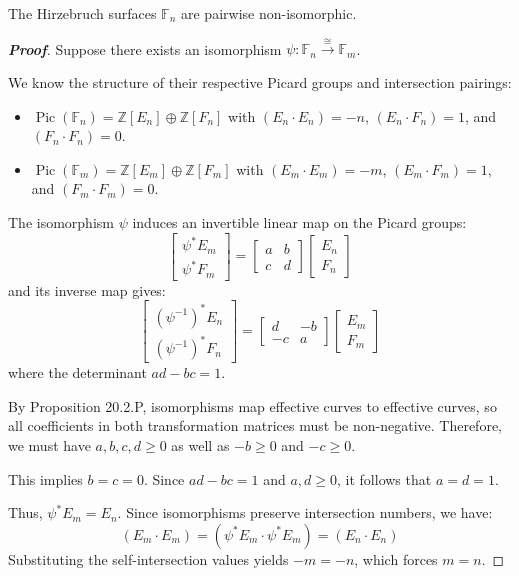 \begin{corollary}[20.2.Q]
The Hirzebruch surfaces $\mathbb{F}_n$ are pairwise non-isomorphic.
\end{corollary}

\begin{proof}[\textbf{Proof}]
Suppose there exists an isomorphism $\psi: \mathbb{F}_n \xrightarrow{\cong} \mathbb{F}_m$. 

We know the structure of their respective Picard groups and intersection pairings:
\begin{itemize}
    \item $\operatorname{Pic}(\mathbb{F}_n) = \mathbb{Z}[E_n] \oplus \mathbb{Z}[F_n]$ with $(E_n \cdot E_n) = -n$, $(E_n \cdot F_n) = 1$, and $(F_n \cdot F_n) = 0$.
    \item $\operatorname{Pic}(\mathbb{F}_m) = \mathbb{Z}[E_m] \oplus \mathbb{Z}[F_m]$ with $(E_m \cdot E_m) = -m$, $(E_m \cdot F_m) = 1$, and $(F_m \cdot F_m) = 0$.
\end{itemize}

The isomorphism $\psi$ induces an invertible linear map on the Picard groups:
\[
\begin{bmatrix} \psi^* E_m \\ \psi^* F_m \end{bmatrix} = \begin{bmatrix} a & b \\ c & d \end{bmatrix} \begin{bmatrix} E_n \\ F_n \end{bmatrix}
\]
and its inverse map gives:
\[
\begin{bmatrix} (\psi^{-1})^* E_n \\ (\psi^{-1})^* F_n \end{bmatrix} = \begin{bmatrix} d & -b \\ -c & a \end{bmatrix} \begin{bmatrix} E_m \\ F_m \end{bmatrix}
\]
where the determinant $ad - bc = 1$.

By Proposition 20.2.P, isomorphisms map effective curves to effective curves, so all coefficients in both transformation matrices must be non-negative. Therefore, we must have $a, b, c, d \ge 0$ as well as $-b \ge 0$ and $-c \ge 0$.

This implies $b = c = 0$. Since $ad - bc = 1$ and $a, d \ge 0$, it follows that $a = d = 1$. 

Thus, $\psi^* E_m = E_n$. Since isomorphisms preserve intersection numbers, we have:
\[
(E_m \cdot E_m) = (\psi^* E_m \cdot \psi^* E_m) = (E_n \cdot E_n)
\]
Substituting the self-intersection values yields $-m = -n$, which forces $m = n$.
\end{proof}


